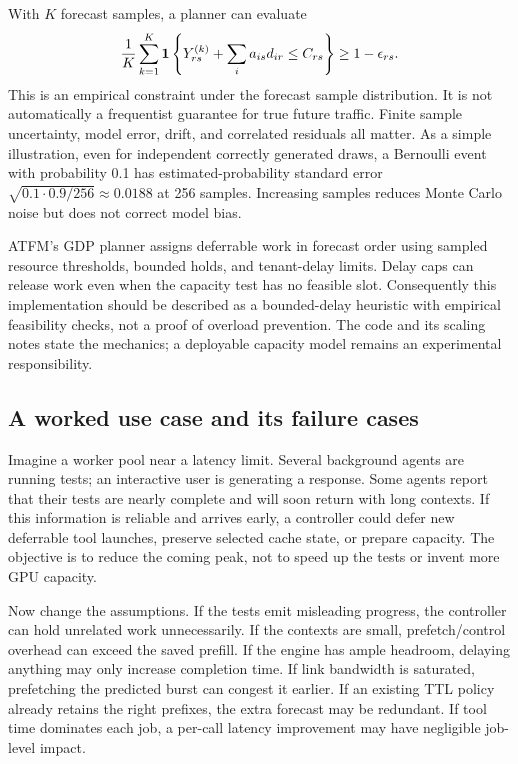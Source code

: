 With $K$ forecast samples, a planner can evaluate
\begin{equation}
 \frac1K\sum_{k=1}^K\mathbf{1}\left\{Y_{rs}^{(k)}+\sum_i a_{is}d_{ir}\le C_{rs}\right\}
 \ge1-\epsilon_{rs}.
\end{equation}
This is an empirical constraint under the forecast sample distribution. It is
not automatically a frequentist guarantee for true future traffic. Finite
sample uncertainty, model error, drift, and correlated residuals all matter.
As a simple illustration, even for independent correctly generated draws, a
Bernoulli event with probability 0.1 has estimated-probability standard error
$\sqrt{0.1\cdot0.9/256}\approx0.0188$ at 256 samples. Increasing samples reduces
Monte Carlo noise but does not correct model bias.

ATFM's GDP planner assigns deferrable work in forecast order using sampled
resource thresholds, bounded holds, and tenant-delay limits. Delay caps can
release work even when the capacity test has no feasible slot. Consequently
this implementation should be described as a bounded-delay heuristic with
empirical feasibility checks, not a proof of overload prevention. The code and
its scaling notes state the mechanics; a deployable capacity model remains an
experimental responsibility.

\subsection{A worked use case and its failure cases}
Imagine a worker pool near a latency limit. Several background agents are
running tests; an interactive user is generating a response. Some agents report
that their tests are nearly complete and will soon return with long contexts.
If this information is reliable and arrives early, a controller could defer
new deferrable tool launches, preserve selected cache state, or prepare capacity.
The objective is to reduce the coming peak, not to speed up the tests or invent
more GPU capacity.

Now change the assumptions. If the tests emit misleading progress, the
controller can hold unrelated work unnecessarily. If the contexts are small,
prefetch/control overhead can exceed the saved prefill. If the engine has ample
headroom, delaying anything may only increase completion time. If link bandwidth
is saturated, prefetching the predicted burst can congest it earlier. If an
existing TTL policy already retains the right prefixes, the extra forecast may
be redundant. If tool time dominates each job, a per-call latency improvement
may have negligible job-level impact.

